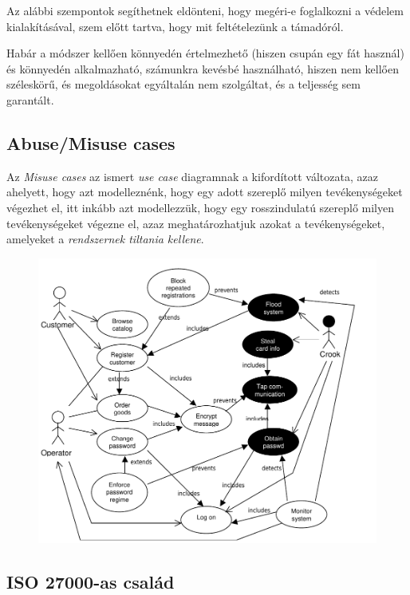 
Az alábbi szempontok segíthetnek eldönteni, hogy megéri-e foglalkozni a védelem kialakításával,
szem előtt tartva, hogy mit feltételezünk a támadóról.

Habár a módszer kellően könnyedén értelmezhető (hiszen csupán egy fát használ) és könnyedén
alkalmazható, számunkra kevésbé használható, hiszen nem kellően széleskörű, és megoldásokat
egyáltalán nem szolgáltat, és a teljesség sem garantált.

\subsection{Abuse/Misuse cases}

Az \emph{Misuse cases} az ismert \emph{use case} diagramnak a kifordított változata, azaz ahelyett,
hogy azt modelleznénk, hogy egy adott szereplő milyen tevékenységeket végezhet el, itt inkább azt
modellezzük, hogy egy rosszindulatú szereplő milyen tevékenységeket végezne el, azaz
meghatározhatjuk azokat a tevékenységeket, amelyeket a \emph{rendszernek tiltania kellene}.

\begin{figure}[h]
    \centering
    \includegraphics[width=\textwidth, height=0.5\textheight, keepaspectratio]{figures/misusecase.png}
\end{figure}

\FloatBarrier
\subsection{ISO 27000-as család}
